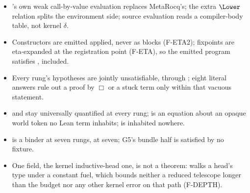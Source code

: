\begin{itemize}
\item {} \lbox{}'s own weak call-by-value evaluation replaces MetaRocq's; the extra
$\Lower$ relation splits the environment side; source evaluation reads a compiler-body table, not
kernel $\delta$.
\item {} Constructors are emitted applied, never as blocks (F-ETA2); fixpoints are
eta-expanded at the registration point (F-ETA), so the emitted program satisfies
,  included.
\item {} Every rung's hypotheses are jointly unsatisfiable, through ;
eight literal answers rule out a proof by $\Box$ or a stuck term only within that vacuous statement.
\item {}  and  stay universally quantified at every rung; 
is an equation about an opaque world token no Lean term inhabits;  is inhabited nowhere.
\item {}  is a binder at seven rungs,  at seven; G5's 
bundle half is satisfied by no fixture.
\item {} One  field, the kernel inductive-head one, is not a theorem:
 walks a head's type under a constant fuel, which bounds neither a reduced
telescope longer than the budget nor any other kernel error on that path (F-DEPTH).
\end{itemize}
